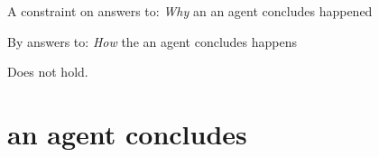 \documentclass[10pt]{article}
\title{
  \fc{3}
}
\date{ }
\begin{document}
\maketitle

\begin{comment}
  \begin{itemize}
  \item
    Goal for this talk is to cover the foundations of the thesis.
    If things go well, at the end of the presentation you will have a fairly good idea of:
    \begin{enumerate}
    \item
      Broadly, what the thesis is about.
    \item
      What I argued for.
    \item
      The `core' of the argument.

      The thesis is very detail oriented.
      However, most of the thesis amounts to refining a particular idea to obtain a specific result.
      The way the idea is refined is beyond the scope of a presentation like this, but I think the idea itself almost fits.
    \end{enumerate}
  \end{itemize}
\end{comment}


\begin{thesis}
  A constraint on answers to: \emph{Why} an  an agent concludes happened

  By answers to: \emph{How} the  an agent concludes happens

  Does not hold.
\end{thesis}

\begin{comment}
  The phrase `an \eiw{0} an agent concludes happens' is carefully chosen.
  It might be more natural to ask why `an agent concludes'.
  However, this suggests something about agency.
  At issue is why the event happened, rather than why the agent concluded.
\end{comment}

\section{ an agent concludes}
\label{sec:overview}
\end{document}
